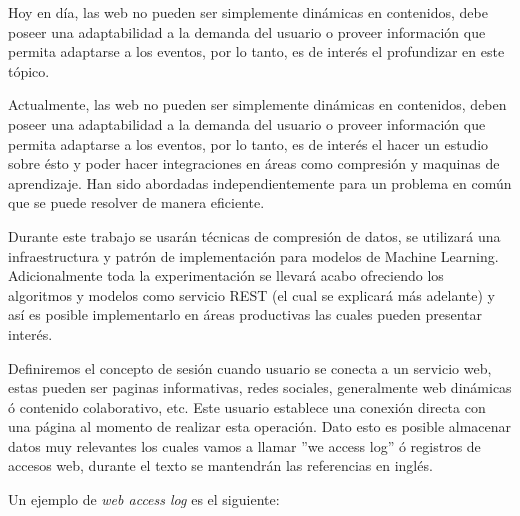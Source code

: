   Hoy en día, las web no pueden ser simplemente dinámicas en contenidos, debe poseer una adaptabilidad a la demanda del usuario o proveer información que permita adaptarse a los eventos, por lo tanto, es de interés el profundizar en este tópico.

  Actualmente, las web no pueden ser simplemente dinámicas en contenidos, deben poseer una adaptabilidad a la demanda del usuario o proveer información que permita adaptarse a los eventos, por lo tanto, es de interés el hacer un estudio sobre ésto y poder hacer integraciones en áreas como compresión y maquinas de aprendizaje. Han sido abordadas independientemente para un problema en común que se puede resolver de manera eficiente. 

  Durante este trabajo se usarán técnicas de compresión de datos, se utilizará una infraestructura y patrón de implementación para modelos de Machine Learning. Adicionalmente toda la experimentación se llevará acabo ofreciendo los algoritmos y modelos como servicio REST (el cual se explicará más adelante) y así es posible implementarlo en áreas productivas las cuales pueden presentar interés.

  Definiremos el concepto de sesión cuando usuario se conecta a un servicio web, estas pueden ser paginas informativas, redes sociales, generalmente web dinámicas ó contenido colaborativo, etc. Este usuario establece una conexión directa con una página al momento de realizar esta operación. Dato esto es posible almacenar datos muy relevantes los cuales vamos a llamar ''we access log'' ó registros de accesos web, durante el texto se mantendrán las referencias en inglés.

  Un ejemplo de \emph{web access log} es el siguiente:


